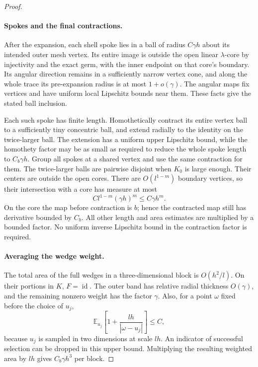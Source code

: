 \documentclass[11pt]{article}
\numberwithin{equation}{section}
\theoremstyle{definition}
\theoremstyle{remark}
\newcommand{\Id}{\operatorname{id}}
\begin{document}
\begin{proof}
\paragraph{Spokes and the final contractions.}
After the expansion, each shell spoke lies in a ball of radius
$C\gamma h$ about its intended outer mesh vertex.  Its entire image is outside the open linear $\lambda$-core by
injectivity and the exact germ, with the inner endpoint on that
core's boundary.  Its angular direction remains in a sufficiently
narrow vertex cone, and along the whole trace its pre-expansion
radius is at most $1+o(\gamma)$.  The angular maps fix vertices and have uniform local
Lipschitz bounds near them.  These facts give the stated ball
inclusion.

Each such spoke has finite length.  Homothetically contract its
entire vertex ball to a sufficiently tiny concentric ball, and extend
radially to the identity on the twice-larger ball.  The extension has
a uniform upper Lipschitz bound, while the homothety factor may be as
small as required to reduce the whole spoke length to
$C_b\gamma h$.  Group all spokes at a shared vertex and use the same
contraction for them.  The twice-larger balls are pairwise disjoint
when $K_0$ is large enough.  Their centers are outside the open cores.
There are $O(l^{1-m})$ boundary vertices, so their intersection with
a core has measure at most
\[
 C l^{1-m}(\gamma h)^m\le C\gamma h^m.
\]
On the core the map before contraction is $b$; hence the contracted
map still has derivative bounded by $C_b$.  All other length and
area estimates are multiplied by a bounded factor.  No uniform
inverse Lipschitz bound in the contraction factor is required.

\paragraph{Averaging the wedge weight.}
The total area of the full wedges in a three-dimensional block is
$O(h^2/l)$.  On their portions in $K$, $F=\Id$.  The outer band has
relative radial thickness $O(\gamma)$, and the remaining nonzero
weight has the factor $\gamma$.  Also, for a point $\omega$ fixed
before the choice of $u_j$,
\[
 \mathbb E_{u_j}\left[1+\frac{lh}{|\omega-u_j|}\right]\le C,
\]
because $u_j$ is sampled in two dimensions at scale $lh$.  An
indicator of successful selection can be dropped in this upper
bound.  Multiplying the resulting weighted area by $lh$ gives
$C_b\gamma h^3$ per block.


\end{proof}
\end{document}
